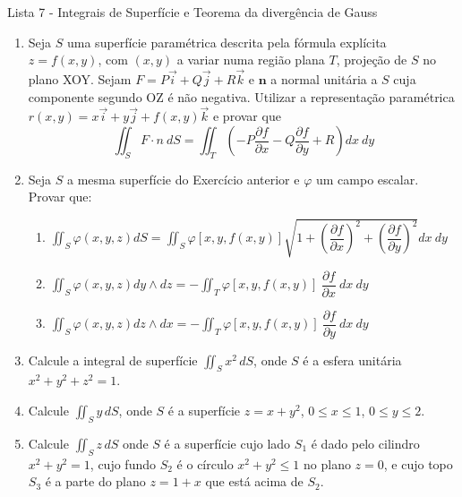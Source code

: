\documentclass[11pt,a4paper]{article}
\begin{document}
	\begin{center}
		\Large Lista 7 - Integrais de Superfície e Teorema da divergência de Gauss
	\end{center}
	

	\begin{enumerate}
	
	\item Seja $S$ uma superfície paramétrica descrita pela fórmula explícita $z = f(x,y)$, com $(x,y)$ a variar numa região plana $T$, projeção de $S$ no plano XOY. Sejam $F = P\vec{i} + Q\vec{j} + R\vec{k}$ e $\textbf{n}$ a normal unitária a $S$ cuja componente segundo OZ é não negativa. Utilizar a representação paramétrica $r(x,y) = x\vec{i} + y\vec{j} + f(x,y)\vec{k}$ e provar que
	$$\displaystyle\iint_S F \cdot n \ dS = \displaystyle\iint_T \left( -P\displaystyle\dfrac{\partial f}{\partial x} - Q\displaystyle\dfrac{\partial f}{\partial y} + R\right) dx \ dy$$
	
	\item Seja $S$ a mesma superfície do Exercício anterior e $\varphi$ um campo escalar. Provar que:
	\begin{enumerate}
	\item $\displaystyle\iint_S \varphi (x,y,z) dS = \displaystyle\iint_S \varphi [x,y,f(x,y)]\sqrt{1 + \left(\displaystyle\dfrac{\partial f}{\partial x}\right)^2 + \left(\displaystyle\dfrac{\partial f}{\partial y}\right)^2} dx \ dy $
	\item $\displaystyle\iint_S \varphi (x,y,z) dy \wedge dz  = - \displaystyle\iint_T \varphi [x,y,f(x,y)] \ \displaystyle\dfrac{\partial f}{\partial x} \ dx \ dy$
	\item $\displaystyle\iint_S \varphi (x,y,z) dz \wedge dx  = - \displaystyle\iint_T \varphi [x,y,f(x,y)] \ \displaystyle\dfrac{\partial f}{\partial y} \ dx \ dy$
	\end{enumerate}
	
	\item Calcule a integral de superfície $\displaystyle\iint_S x^2 \, dS$, onde $S$ é a  esfera unitária $x^2 + y^2 + z^2 = 1$.
 
	\item Calcule $\displaystyle\iint_S y \, dS$, onde $S$ é a superfície $z = x + y^2$, $0 \leq x \leq 1$, $0 \leq y \leq 2$.
	
	\item Calcule $\displaystyle\iint_S z \, dS$ onde $S$ é a superfície cujo lado $S_1$ é dado pelo cilindro $x^2 + y^2 = 1$, cujo fundo $S_2$ é o círculo $x^2 + y^2 \leq 1$ no plano $z = 0$, e cujo topo $S_3$ é a parte do plano $z = 1 + x$ que está acima de $S_2$.
      

\end{enumerate}
\end{document}
